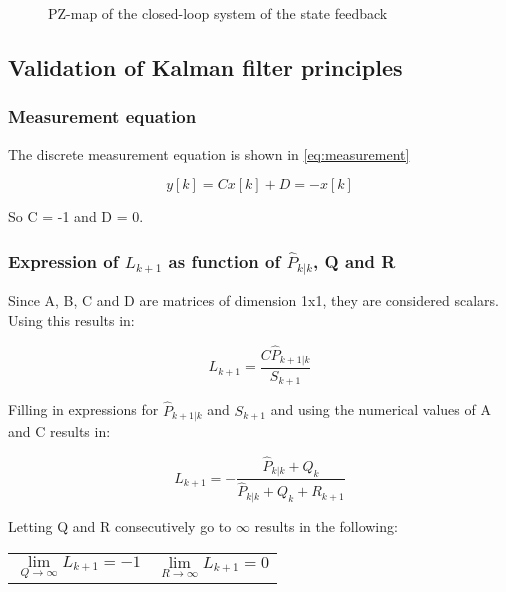 \documentclass[a4paper]{article}
\newcommand{\newpar}{\vspace{.3cm}\noindent}
\begin{document}
\begin{figure}[H]
    \caption{PZ-map of the closed-loop system of the state feedback}
    \label{fig:vraag3.1.b_pz}
\end{figure}

\subsection{Validation of Kalman filter principles}
\subsubsection{Measurement equation} 

The discrete measurement equation is shown in \autoref{eq:measurement}

\begin{equation}
    y[k] = Cx[k] + D = -x[k]
    \label{eq:measurement}
\end{equation}

\newpar
So C = -1 and D = 0.

\subsubsection{Expression of \(L_{k+1}\) as function of \(\hat{P}_{k|k}\), Q and R}
\label{section:L_kp1}

Since A, B, C and D are matrices of dimension 1x1, they are considered scalars. Using this results in:

\begin{equation}
    L_{k+1} = \frac{C\hat{P}_{k+1|k}}{S_{k+1}}
\end{equation}

\newpar
Filling in expressions for \(\hat{P}_{k+1|k}\) and \(S_{k+1}\) and using the numerical values of A and C results in:

\begin{equation}
    L_{k+1} = -\frac{\hat{P}_{k|k} + Q_{k}}{\hat{P}_{k|k} + Q_{k} + R_{k+1}}
    \label{eq:2bL}
\end{equation}

\newpar
Letting Q and R consecutively go to \(\infty\) results in the following:

\begin{center}
    \begin{tabular}{p{5cm}p{5cm}}
        \begin{equation}
            \lim_{Q\to\infty} L_{k+1} = -1
            \label{eq:LQinf}
        \end{equation}
        &  
        \begin{equation}
            \lim_{R\to\infty} L_{k+1} = 0
            \label{eq:LRinf}
        \end{equation}
        
    \end{tabular}
\end{center}
\end{document}
